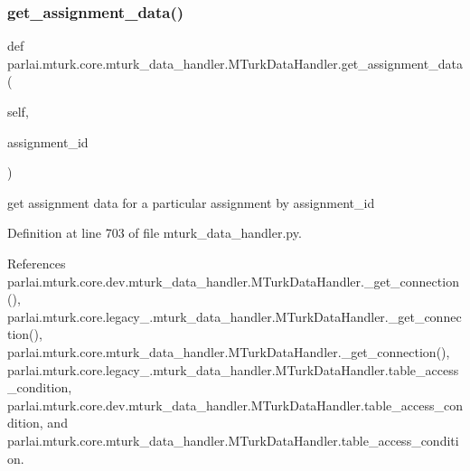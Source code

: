 \subsubsection{\texorpdfstring{get\+\_\+assignment\+\_\+data()}{get\_assignment\_data()}}
{\footnotesize\ttfamily def parlai.\+mturk.\+core.\+mturk\+\_\+data\+\_\+handler.\+M\+Turk\+Data\+Handler.\+get\+\_\+assignment\+\_\+data (\begin{DoxyParamCaption}\item[{}]{self,  }\item[{}]{assignment\+\_\+id }\end{DoxyParamCaption})}

\begin{DoxyVerb}get assignment data for a particular assignment by assignment_id\end{DoxyVerb}
 

Definition at line 703 of file mturk\+\_\+data\+\_\+handler.\+py.



References parlai.\+mturk.\+core.\+dev.\+mturk\+\_\+data\+\_\+handler.\+M\+Turk\+Data\+Handler.\+\_\+get\+\_\+connection(), parlai.\+mturk.\+core.\+legacy\+\_.\+mturk\+\_\+data\+\_\+handler.\+M\+Turk\+Data\+Handler.\+\_\+get\+\_\+connection(), parlai.\+mturk.\+core.\+mturk\+\_\+data\+\_\+handler.\+M\+Turk\+Data\+Handler.\+\_\+get\+\_\+connection(), parlai.\+mturk.\+core.\+legacy\+\_.\+mturk\+\_\+data\+\_\+handler.\+M\+Turk\+Data\+Handler.\+table\+\_\+access\+\_\+condition, parlai.\+mturk.\+core.\+dev.\+mturk\+\_\+data\+\_\+handler.\+M\+Turk\+Data\+Handler.\+table\+\_\+access\+\_\+condition, and parlai.\+mturk.\+core.\+mturk\+\_\+data\+\_\+handler.\+M\+Turk\+Data\+Handler.\+table\+\_\+access\+\_\+condition.

